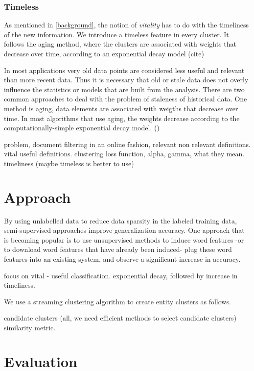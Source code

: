\documentclass{article}
\begin{document}
\subsubsection{Timeless}

As mentioned in \ref{background}, the notion of {\it vitality} has to do with the timeliness of the new information. We introduce a timeless feature in every cluster. It follows the aging method, where the clusters are associated with weights that decrease over time, according to an exponential decay model (cite)

In most applications very old data points are considered less useful and relevant than more recent data. Thus it is necessary that old or stale data does not overly influence the statistics or models that are built from the analysis. There are two common approaches to deal with the problem of staleness of historical data. One method is aging, data elements are associated with weigths that decrease over time. In most algorithms that use aging, the weights decrease according to the computationally-simple exponential decay model. ()


problem, document filtering in an online fashion, 
relevant non relevant definitions.
vital useful definitions.
clustering loss function, alpha, gamma, what they mean.
timeliness (maybe timeless is better to use)

\section{Approach}
\label{approach}


By using unlabelled data to reduce data sparsity in the labeled training data, semi-supervised approaches improve generalization accuracy.
One approach that is becoming popular is to use unsupervised methods to induce word features -or to download word features that have already been induced- plug these word features into an existing system, and observe a significant increase in accuracy.


focus on vital - useful classification.
exponential decay, followed by increase in timeliness.

We use a streaming clustering algorithm to create entity clusters as follows.

candidate clusters (all, we need efficient methods to select candidate clusters)
similarity metric.


\section{Evaluation}
\label{evaluation}
\end{document}
